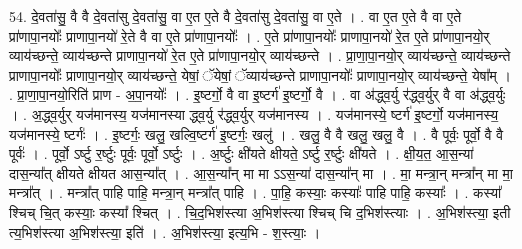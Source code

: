 \documentclass[17pt]{extarticle}
\begin{document}
54. दे॒वता॑सु॒ वै वै दे॒वता॑सु दे॒वता॑सु॒ वा ए॒त ए॒ते वै दे॒वता॑सु दे॒वता॑सु॒ वा ए॒ते । . वा ए॒त ए॒ते वै वा ए॒ते प्रा॑णापा॒नयोः᳚ प्राणापा॒नयो॑ रे॒ते वै वा ए॒ते प्रा॑णापा॒नयोः᳚ । . ए॒ते प्रा॑णापा॒नयोः᳚ प्राणापा॒नयो॑ रे॒त ए॒ते प्रा॑णापा॒नयो॒र् व्याय॑च्छन्ते॒ व्याय॑च्छन्ते प्राणापा॒नयो॑ रे॒त ए॒ते प्रा॑णापा॒नयो॒र् व्याय॑च्छन्ते । . प्रा॒णा॒पा॒नयो॒र् व्याय॑च्छन्ते॒ व्याय॑च्छन्ते प्राणापा॒नयोः᳚ प्राणापा॒नयो॒र् व्याय॑च्छन्ते॒ येषां॒ ॅयेषां॒ ॅव्याय॑च्छन्ते प्राणापा॒नयोः᳚ प्राणापा॒नयो॒र् व्याय॑च्छन्ते॒ येषा᳚म् । . प्रा॒णा॒पा॒नयो॒रिति॑ प्राण - अ॒पा॒नयोः᳚ । . इ॒ष्टर्गो॒ वै वा इ॒ष्टर्ग॑ इ॒ष्टर्गो॒ वै । . वा अ॑द्ध्व॒र्यु र॑द्ध्व॒र्युर् वै वा अ॑द्ध्व॒र्युः । . अ॒द्ध्व॒र्युर् यज॑मानस्य॒ यज॑मानस्या द्ध्व॒र्यु र॑द्ध्व॒र्युर् यज॑मानस्य । . यज॑मानस्ये॒ ष्टर्ग॑ इ॒ष्टर्गो॒ यज॑मानस्य॒ यज॑मानस्ये॒ ष्टर्गः॑ । . इ॒ष्टर्गः॒ खलु॒ खल्वि॒ष्टर्ग॑ इ॒ष्टर्गः॒ खलु॑ । . खलु॒ वै वै खलु॒ खलु॒ वै । . वै पूर्वः॒ पूर्वो॒ वै वै पूर्वः॑ । . पूर्वो॒ ऽर्ष्टु र॒र्ष्टुः पूर्वः॒ पूर्वो॒ ऽर्ष्टुः । . अ॒र्ष्टुः क्षी॑यते क्षीयते॒ ऽर्ष्टु र॒र्ष्टुः क्षी॑यते । . क्षी॒य॒त॒ आ॒स॒न्या॑ दास॒न्या᳚त् क्षीयते क्षीयत आस॒न्या᳚त् । . आ॒स॒न्या᳚न् मा मा ऽऽस॒न्या॑ दास॒न्या᳚न् मा । . मा॒ मन्त्रा॒न् मन्त्रा᳚न् मा मा॒ मन्त्रा᳚त् । . मन्त्रा᳚त् पाहि पाहि॒ मन्त्रा॒न् मन्त्रा᳚त् पाहि । . पा॒हि॒ कस्याः॒ कस्याः᳚ पाहि पाहि॒ कस्याः᳚ । . कस्या᳚ श्चिच् चि॒त् कस्याः॒ कस्या᳚ श्चित् । . चि॒द॒भिश॑स्त्या अ॒भिश॑स्त्या श्चिच् चि द॒भिश॑स्त्याः । . अ॒भिश॑स्त्या॒ इती त्य॒भिश॑स्त्या अ॒भिश॑स्त्या॒ इति॑ । . अ॒भिश॑स्त्या॒ इत्य॒भि - श॒स्त्याः॒ । \newline
\end{document}

